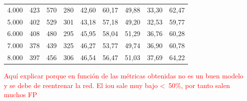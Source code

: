 \begin{table}[ht!]
\begin{tabular}{lcccccccc}
4.000               & 423          & 570          & 280          & 42,60                                                             & 60,17                                                          & 49,88                                                           & 33,30                                                               & 62,47                                                             \\
5.000               & 402          & 529          & 301          & 43,18                                                             & 57,18                                                          & 49,20                                                           & 32,53                                                               & 59,77                                                             \\
6.000               & 408          & 480          & 295          & 45,95                                                             & 58,04                                                          & 51,29                                                           & 36,76                                                               & 60,28                                                             \\
7.000               & 378          & 439          & 325          & 46,27                                                             & 53,77                                                          & 49,74                                                           & 36,90                                                               & 60,78                                                             \\
8.000               & 397          & 456          & 306          & 46,54                                                             & 56,47                                                          & 51,03                                                           & 37,69                                                               & 64,22                                                             \\ \hline
\end{tabular}
\end{table}

\textcolor{red}{Aquí explicar porque en función de las métricas obtenidas no es un buen modelo y se debe de reentrenar la red. El \gls{iou} sale muy bajo <\ 50\%, por tanto salen muchos FP}

